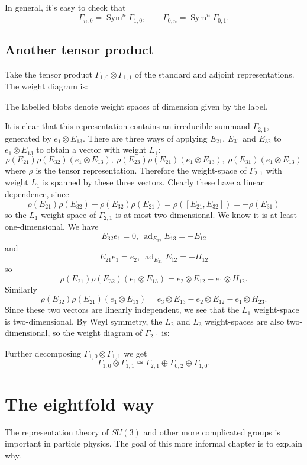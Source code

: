 \documentclass[12pt]{article}
\newcommand{\OP}{\operatorname}
\newcommand{\ad}{\OP{ad}}
\newcommand{\Sym}{\OP{Sym}}
\theoremstyle{definition}
\theoremstyle{check}
\theoremstyle{remark}
\theoremstyle{TheoremNum}
\begin{document}
In general, it's easy to check that
\[\Gamma_{n,0}=\Sym^n\Gamma_{1,0},\qquad \Gamma_{0,n}=\Sym^n\Gamma_{0,1}.\]

\subsection{Another tensor product}

Take the tensor product $\Gamma_{1,0}\otimes\Gamma_{1,1}$ of the standard and adjoint representations. The weight diagram is:

\slbeast

The labelled blobs denote weight spaces of dimension given by the label.

It is clear that this representation contains an irreducible summand $\Gamma_{2,1}$, generated by $e_1\otimes E_{13}$. There are three ways of applying $E_{21}$, $E_{31}$ and $E_{32}$ to $e_1\otimes E_{13}$ to obtain a vector with weight $L_1$:
\[\rho(E_{21})\rho(E_{32})(e_1\otimes E_{13}),\ \rho(E_{23})\rho(E_{21})(e_1\otimes E_{13}),\ \rho(E_{31})(e_1\otimes E_{13})\]
where $\rho$ is the tensor representation. Therefore the weight-space of $\Gamma_{2,1}$ with weight $L_1$ is spanned by these three vectors. Clearly these have a linear dependence, since
\[\rho(E_{21})\rho(E_{32})-\rho(E_{32})\rho(E_{21})=\rho([E_{21},E_{32}])=-\rho(E_{31})\]
so the $L_1$ weight-space of $\Gamma_{2,1}$ is at most two-dimensional. We know it is at least one-dimensional. We have
\[E_{32}e_1=0,\ \ad_{E_{32}}E_{13}=-E_{12}\]
and
\[E_{21}e_1=e_2,\ \ad_{E_{21}}E_{12}=-H_{12}\]
so
\[\rho(E_{21})\rho(E_{32})(e_1\otimes E_{13})=e_2\otimes E_{12}-e_1\otimes H_{12}.\]
Similarly
\[\rho(E_{32})\rho(E_{21})(e_1\otimes E_{13})=e_3\otimes E_{13}-e_2\otimes E_{12}-e_1\otimes H_{23}.\]
Since these two vectors are linearly independent, we see that the $L_1$ weight-space is two-dimensional. By Weyl symmetry, the $L_2$ and $L_3$ weight-spaces are also two-dimensional, so the weight diagram of $\Gamma_{2,1}$ is:

\sltwoone

Further decomposing $\Gamma_{1,0}\otimes\Gamma_{1,1}$ we get
\[\Gamma_{1,0}\otimes\Gamma_{1,1}\cong\Gamma_{2,1}\oplus\Gamma_{0,2}\oplus\Gamma_{1,0}.\]

\section{The eightfold way}

The representation theory of $SU(3)$ and other more complicated groups is important in particle physics. The goal of this more informal chapter is to explain why.
\end{document}
